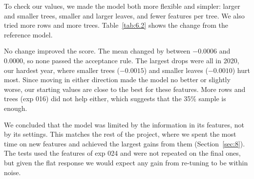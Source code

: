 To check our values, we made the model both more flexible and simpler: larger and smaller trees, smaller and larger leaves, and fewer features per tree. We also tried more rows and more trees. Table~\ref{tab:6.2} shows the change from the reference model.

\begin{table}[H]
  \centering\small
  \caption{Tuning experiments: change in AUC from the reference model (exp 014c for 016, exp 024 for 028a--e)}
  \label{tab:6.2}
\end{table}

No change improved the score. The mean changed by between $-0.0006$ and $0.0000$, so none passed the acceptance rule. The largest drops were all in 2020, our hardest year, where smaller trees ($-0.0015$) and smaller leaves ($-0.0010$) hurt most. Since moving in either direction made the model no better or slightly worse, our starting values are close to the best for these features. More rows and trees (exp 016) did not help either, which suggests that the 35\% sample is enough.

We concluded that the model was limited by the information in its features, not by its settings. This matches the rest of the project, where we spent the most time on new features and achieved the largest gains from them (Section~\ref{sec:8}). The tests used the features of exp 024 and were not repeated on the final ones, but given the flat response we would expect any gain from re-tuning to be within noise.
